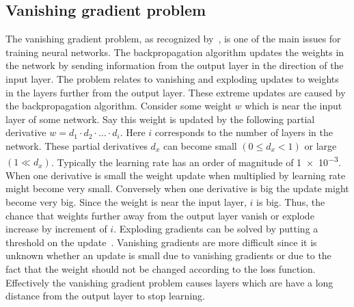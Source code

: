 \subsection{Vanishing gradient problem}
\label{subsec:vanishing_gradient_problem}
The vanishing gradient problem, as recognized by~\citet{hochreiter2001gradient}, is one of the main issues for training neural networks.
The backpropagation algorithm updates the weights in the network by sending information from the output layer in the direction of the input layer.
The problem relates to vanishing and exploding updates to weights in the layers further from the output layer.
These extreme updates are caused by the backpropagation algorithm.
Consider some weight $w$ which is near the input layer of some network.
Say this weight is updated by the following partial derivative $w = d_1 \cdot d_2 \cdot \ldots \cdot d_i$.
Here $i$ corresponds to the number of layers in the network.
These partial derivatives $d_x$ can become small $(0 \leq d_x < 1)$ or large $(1 \ll d_x)$.
Typically the learning rate has an order of magnitude of \num{1e-3}.
When one derivative is small the weight update when multiplied by learning rate might become very small.
Conversely when one derivative is big the update might become very big.
Since the weight is near the input layer, $i$ is big.
Thus, the chance that weights further away from the output layer vanish or explode increase by increment of $i$.
Exploding gradients can be solved by putting a threshold on the update~\citep{mikolov2013distributed}.
Vanishing gradients are more difficult since it is unknown whether an update is small due to vanishing gradients or due to the fact that the weight should not be changed according to the loss function.
Effectively the vanishing gradient problem causes layers which are have a long distance from the output layer to stop learning.


